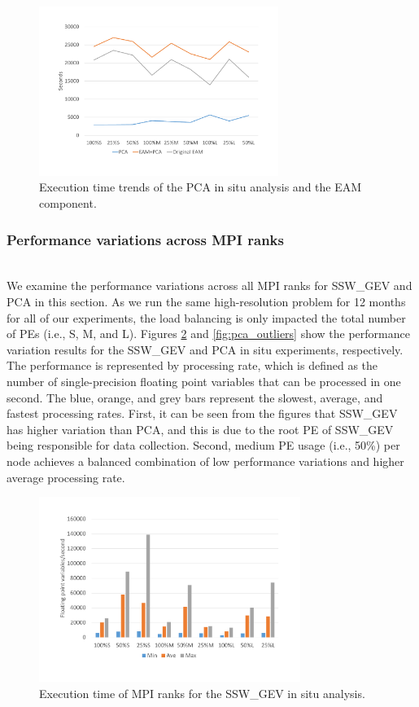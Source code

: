 \documentclass{juliacon}
\begin{document}
\begin{figure}
    \centering
    \includegraphics[width=\linewidth, height=5.5cm]{figures/pca_trend.pdf}
    \caption{Execution time trends of the PCA in situ analysis and the EAM component.}
    \label{fig:pca_trend}
\end{figure}


\subsubsection{Performance variations across MPI ranks}\hspace*{\fill} \\

We examine the performance variations across all MPI ranks for SSW\_GEV and PCA in this section. As we run the same high-resolution problem for 12 months for all of our experiments, the load balancing is only impacted the total number of PEs (i.e., S, M, and L). Figures \ref{fig:ssw_outliers} and \ref{fig:pca_outliers} show the performance variation results for the SSW\_GEV and PCA in situ experiments, respectively. The performance is represented by processing rate, which is defined as the number of single-precision floating point variables that can be processed in one second. The blue, orange, and grey bars represent the slowest, average, and fastest processing rates. First, it can be seen from the figures that SSW\_GEV has higher variation than PCA, and this is due to the root PE of SSW\_GEV being responsible for data collection. Second, medium PE usage (i.e., 50\%) per node achieves a balanced combination of low performance variations and higher average processing rate. 

\begin{figure}
    \centering
    \includegraphics[width=\linewidth, height=6cm]{figures/ssw_outliers.pdf}
    \caption{Execution time of MPI ranks for the SSW\_GEV in situ analysis.}
    \label{fig:ssw_outliers}
\end{figure}
\end{document}
